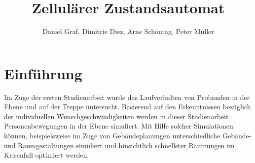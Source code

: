 

\title{Zellulärer Zustandsautomat}
\providecommand{\subtitle}[1]{}
\subtitle{3. Projekt zu Modellierung und Simulation}
\author{Daniel Graf, Dimitrie Diez, Arne Schöntag, Peter Müller}
\date{}



\maketitle

\tableofcontents
\section{Einführung}
Im Zuge der ersten Studienarbeit wurde das Laufverhalten von Probanden in der Ebene und auf der Treppe untersucht. Basierend auf den Erkenntnissen bezüglich der individuellen Wunschgeschwindigkeiten werden in dieser Studienarbeit Personenbewegungen in der Ebene simuliert. Mit Hilfe solcher Simulationen können, beispielsweise im Zuge von Gebäudeplanungen unterschiedliche Gebäude- und Raumgestaltungen simuliert und hinsichtlich schnellster Räumungen im Krisenfall optimiert werden. 

